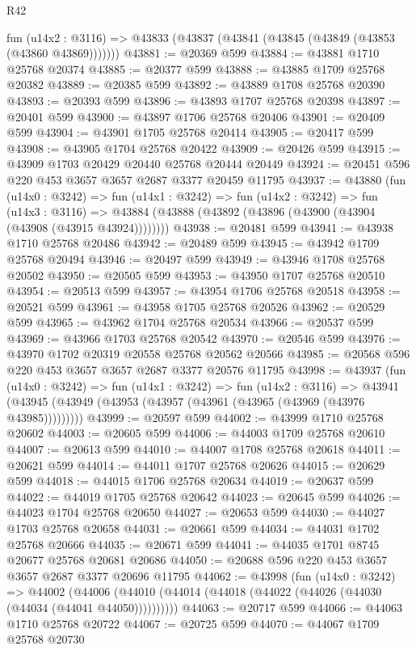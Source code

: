 \begin{lexlean}{R42}
\begin{coremodule}
    fun (u14x2 : @3116) => @43833 (@43837 (@43841 (@43845 (@43849 (@43853 (@43860 @43869)))))))
@43881 := @20369 @599
@43884 := @43881 @1710 @25768 @20374
@43885 := @20377 @599
@43888 := @43885 @1709 @25768 @20382
@43889 := @20385 @599
@43892 := @43889 @1708 @25768 @20390
@43893 := @20393 @599
@43896 := @43893 @1707 @25768 @20398
@43897 := @20401 @599
@43900 := @43897 @1706 @25768 @20406
@43901 := @20409 @599
@43904 := @43901 @1705 @25768 @20414
@43905 := @20417 @599
@43908 := @43905 @1704 @25768 @20422
@43909 := @20426 @599
@43915 := @43909 @1703 @20429 @20440 @25768 @20444 @20449
@43924 := @20451 @596 @220 @453 @3657 @3657 @2687 @3377 @20459 @11795
@43937 := @43880
    (fun (u14x0 : @3242) =>
    fun (u14x1 : @3242) =>
    fun (u14x2 : @3242) =>
    fun (u14x3 : @3116) =>
    @43884 (@43888 (@43892 (@43896 (@43900 (@43904 (@43908 (@43915 @43924))))))))
@43938 := @20481 @599
@43941 := @43938 @1710 @25768 @20486
@43942 := @20489 @599
@43945 := @43942 @1709 @25768 @20494
@43946 := @20497 @599
@43949 := @43946 @1708 @25768 @20502
@43950 := @20505 @599
@43953 := @43950 @1707 @25768 @20510
@43954 := @20513 @599
@43957 := @43954 @1706 @25768 @20518
@43958 := @20521 @599
@43961 := @43958 @1705 @25768 @20526
@43962 := @20529 @599
@43965 := @43962 @1704 @25768 @20534
@43966 := @20537 @599
@43969 := @43966 @1703 @25768 @20542
@43970 := @20546 @599
@43976 := @43970 @1702 @20319 @20558 @25768 @20562 @20566
@43985 := @20568 @596 @220 @453 @3657 @3657 @2687 @3377 @20576 @11795
@43998 := @43937
    (fun (u14x0 : @3242) =>
    fun (u14x1 : @3242) =>
    fun (u14x2 : @3116) =>
    @43941 (@43945 (@43949 (@43953 (@43957 (@43961 (@43965 (@43969 (@43976 @43985)))))))))
@43999 := @20597 @599
@44002 := @43999 @1710 @25768 @20602
@44003 := @20605 @599
@44006 := @44003 @1709 @25768 @20610
@44007 := @20613 @599
@44010 := @44007 @1708 @25768 @20618
@44011 := @20621 @599
@44014 := @44011 @1707 @25768 @20626
@44015 := @20629 @599
@44018 := @44015 @1706 @25768 @20634
@44019 := @20637 @599
@44022 := @44019 @1705 @25768 @20642
@44023 := @20645 @599
@44026 := @44023 @1704 @25768 @20650
@44027 := @20653 @599
@44030 := @44027 @1703 @25768 @20658
@44031 := @20661 @599
@44034 := @44031 @1702 @25768 @20666
@44035 := @20671 @599
@44041 := @44035 @1701 @8745 @20677 @25768 @20681 @20686
@44050 := @20688 @596 @220 @453 @3657 @3657 @2687 @3377 @20696 @11795
@44062 := @43998
    (fun (u14x0 : @3242) =>
    @44002 (@44006 (@44010 (@44014 (@44018 (@44022 (@44026 (@44030 (@44034 (@44041 @44050))))))))))
@44063 := @20717 @599
@44066 := @44063 @1710 @25768 @20722
@44067 := @20725 @599
@44070 := @44067 @1709 @25768 @20730

\end{coremodule}
\end{lexlean}
